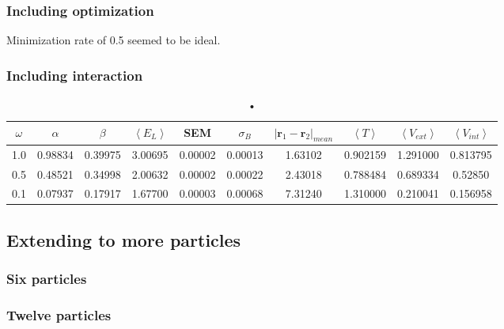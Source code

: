 \subsubsection{Including optimization}

Minimization rate of 0.5 seemed to be ideal. 

\subsubsection{Including interaction}

\begin{table}[H]\caption{•}\label{Ground state energy of two interacting electrons in harmonic oscillator trap.}
\center
\begin{tabular}{c|ccccccccc}
$\omega$ & $\alpha$ & $\beta$ & $\left< E_L \right>$ & SEM & $\sigma_B$ & $|\bm{r}_1-\bm{r}_2|_{mean}$ & $\left< T \right>$  & $\left< V_{ext}\right>$ & $\left<V_{int} \right>$  \\ \hline
 1.0 &  0.98834 & 0.39975 & 3.00695 & 0.00002 & 0.00013 & 1.63102 &  0.902159 & 1.291000 & 0.813795\\
 0.5 &  0.48521 & 0.34998 & 2.00632 & 0.00002 & 0.00022 & 2.43018 & 0.788484 & 0.689334 & 0.52850 \\
 0.1 & 0.07937 & 0.17917 & 1.67700 & 0.00003 & 0.00068  & 7.31240 & 1.310000 & 0.210041 & 0.156958  \\
\end{tabular}
\end{table}

\subsection{Extending to more particles}

\subsubsection{Six particles}

\subsubsection{Twelve particles}

